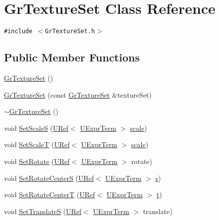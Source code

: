 \hypertarget{class_gr_texture_set}{
\section{GrTextureSet Class Reference}
\label{class_gr_texture_set}
}
{\tt \#include $<$GrTextureSet.h$>$}

\subsection*{Public Member Functions}
\begin{CompactItemize}
\item 
\hyperlink{class_gr_texture_set_af1ff98047184f4b7f063e6d7e0b2b12}{GrTextureSet} ()
\item 
\hyperlink{class_gr_texture_set_080b55aca308912bb5b65b317d4d234a}{GrTextureSet} (const \hyperlink{class_gr_texture_set}{GrTextureSet} \&textureSet)
\item 
\hyperlink{class_gr_texture_set_bcff7abdf78142bf14d6a668a4ceb938}{$\sim$GrTextureSet} ()
\item 
void \hyperlink{class_gr_texture_set_20a06dab1bf98d79626a26d77de2ff05}{SetScaleS} (\hyperlink{class_u_ref}{URef}$<$ \hyperlink{class_u_expr_term}{UExprTerm} $>$ \hyperlink{glext__bak_8h_281421b881aa7a1266842b73a3bc7655}{scale})
\item 
void \hyperlink{class_gr_texture_set_383a76cd969a2a9d4f71344a73ba1b5a}{SetScaleT} (\hyperlink{class_u_ref}{URef}$<$ \hyperlink{class_u_expr_term}{UExprTerm} $>$ \hyperlink{glext__bak_8h_281421b881aa7a1266842b73a3bc7655}{scale})
\item 
void \hyperlink{class_gr_texture_set_4a78fadd4dac3d729a17f3d5a82e8c0b}{SetRotate} (\hyperlink{class_u_ref}{URef}$<$ \hyperlink{class_u_expr_term}{UExprTerm} $>$ rotate)
\item 
void \hyperlink{class_gr_texture_set_1eb411197132c395e312d922b21e95f3}{SetRotateCenterS} (\hyperlink{class_u_ref}{URef}$<$ \hyperlink{class_u_expr_term}{UExprTerm} $>$ \hyperlink{glext__bak_8h_d585a1393cfa368fa9dc3d8ebff640d5}{s})
\item 
void \hyperlink{class_gr_texture_set_ae28e7233bbb26bd6b324d4b05ea6ed2}{SetRotateCenterT} (\hyperlink{class_u_ref}{URef}$<$ \hyperlink{class_u_expr_term}{UExprTerm} $>$ \hyperlink{glext__bak_8h_00140d6f5c548b26daf170bf16e86a6d}{t})
\item 
void \hyperlink{class_gr_texture_set_a00f327706b10cf0cb7035a31a6bf705}{SetTranslateS} (\hyperlink{class_u_ref}{URef}$<$ \hyperlink{class_u_expr_term}{UExprTerm} $>$ translate)

\end{CompactItemize}
